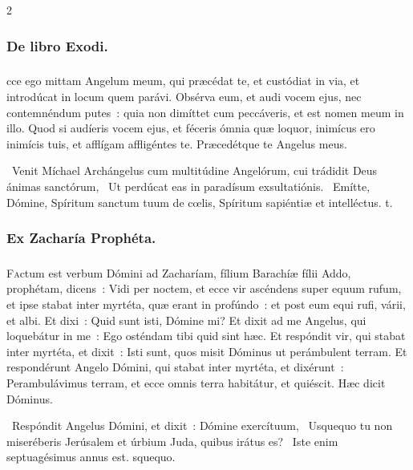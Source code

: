 \documentclass[9pt,twoside]{extarticle}
\begin{document}
\begin{multicols}{2}
{\subsubsection*{\center De libro Exodi.}
\subsubsection*{\center {}}
cce ego mittam Angelum meum, qui præcédat te, et custódiat in via, et introdúcat in locum quem parávi.
Obsérva eum, et audi vocem ejus, nec contemnéndum putes~: quia non dimíttet cum peccáveris, et est nomen meum in illo.
Quod si audíeris vocem ejus, et féceris ómnia quæ loquor, inimícus ero inimícis tuis, et afflígam affligéntes te. Præcedétque te Angelus meus.

\begin{tightlist}{}
\item {}~Venit Míchael Archángelus cum multitúdine Angelórum, cui trádidit Deus ánimas sanctórum, \textred{*}~Ut perdúcat eas in paradísum exsultatiónis. ~Emítte, Dómine, Spíritum sanctum tuum de cœlis, Spíritum sapiéntiæ et intelléctus. t.
\end{tightlist}

\subsubsection*{\center Ex Zacharía Prophéta.}
\subsubsection*{\center {}}
\lettrine{F}actum est verbum Dómini ad Zacharíam, fílium Barachíæ fílii Addo, prophétam, dicens~: Vidi per noctem, et ecce vir ascéndens super equum rufum, et ipse stabat inter myrtéta, quæ erant in profúndo~: et post eum equi rufi, várii, et albi.
Et dixi~: Quid sunt isti, Dómine mi? Et dixit ad me Angelus, qui loquebátur in me~: Ego osténdam tibi quid sint hæc.
Et respóndit vir, qui stabat inter myrtéta, et dixit~: Isti sunt, quos misit Dóminus ut perámbulent terram.
Et respondérunt Angelo Dómini, qui stabat inter myrtéta, et dixérunt~: Perambulávimus terram, et ecce omnis terra habitátur, et quiéscit. Hæc dicit Dóminus.

\begin{tightlist}{}
\item {}~Respóndit Angelus Dómini, et dixit~: Dómine exercítuum, \textred{*}~Usquequo tu non miseréberis Jerúsalem et úrbium Juda, quibus irátus es? ~Iste enim septuagésimus annus est. squequo.
\end{tightlist}

}
\end{multicols}
\end{document}
